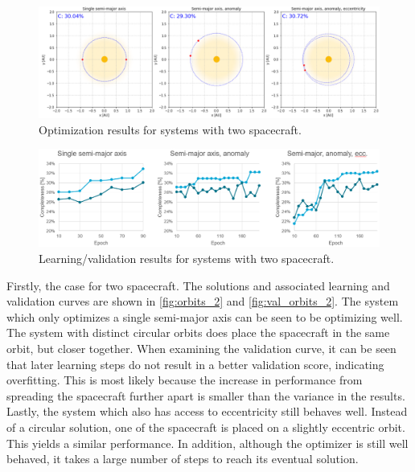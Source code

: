 \begin{figure}[htbp]
 \centering
 \includegraphics[width=1.0\textwidth]{img/orbits_2.png}
 \caption{Optimization results for systems with two spacecraft.}
 \label{fig:orbits_2}
\end{figure}
\begin{figure}[htbp]
 \centering
 \includegraphics[width=1.0\textwidth]{img/val_orbits_2.png}
 \caption{Learning/validation results for systems with two spacecraft.}
 \label{fig:val_orbits_2}
\end{figure}

Firstly, the case for two spacecraft. The solutions and associated learning and validation curves are shown in \autoref{fig:orbits_2} and \autoref{fig:val_orbits_2}. The system which only optimizes a single semi-major axis can be seen to be optimizing well. The system with distinct circular orbits does place the spacecraft in the same orbit, but closer together. When examining the validation curve, it can be seen that later learning steps do not result in a better validation score, indicating overfitting. This is most likely because the increase in performance from spreading the spacecraft further apart is smaller than the variance in the results. Lastly, the system which also has access to eccentricity still behaves well. Instead of a circular solution, one of the spacecraft is placed on a slightly eccentric orbit. This yields a similar performance. In addition, although the optimizer is still well behaved, it takes a large number of steps to reach its eventual solution. \\

